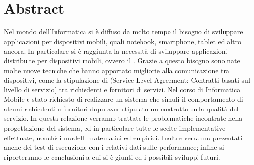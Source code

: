 \chapter*{Abstract}
Nel mondo dell'Informatica si è diffuso da molto tempo il bisogno di sviluppare applicazioni per dispositivi mobili, quali notebook, smartphone, tablet ed altro ancora. In particolare si è raggiunta la necessità di sviluppare applicazioni distribuite per dispositivi mobili, ovvero il . Grazie a questo bisogno sono nate molte nuove tecniche che hanno apportato migliorie alla comunicazione tra dispositivi, come la stipulazione di  (Service Level Agreement: Contratti basati sul livello di servizio) tra richiedenti e fornitori di servizi. Nel corso di Informatica Mobile è stato richiesto di realizzare un sistema che simuli il comportamento di alcuni richiedenti e fornitori dopo aver stipulato un contratto sulla qualità del servizio. In questa relazione verranno trattate le problematiche incontrate nella progettazione del sistema, ed in particolare tutte le scelte implementative effettuate, nonchè i modelli matematici ed empirici. Inoltre verranno presentati anche dei test di esecuzione con i relativi dati sulle performance; infine si riporteranno le conclusioni a cui si è giunti ed i possibili sviluppi futuri.